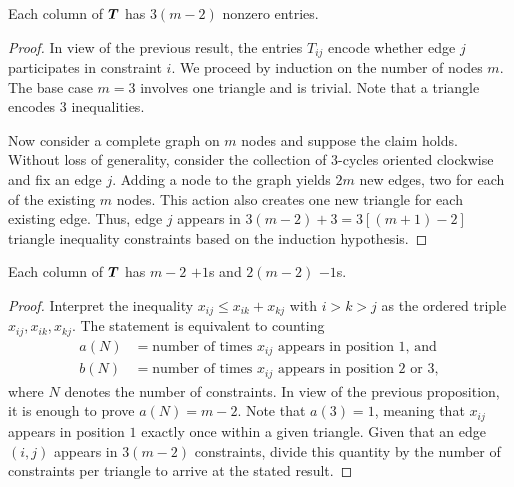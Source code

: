 \documentclass{article}
\begin{document}
\begin{proposition}
    Each column of \(\boldsymbol{T}\) has \(3 (m-2)\) nonzero entries.
\end{proposition}
\begin{proof}
    In view of the previous result, the entries \(T_{ij}\) encode whether edge \(j\) participates in constraint \(i\).
    We proceed by induction on the number of nodes \(m\).
    The base case \(m = 3\) involves one triangle and is trivial.
    Note that a triangle encodes \(3\) inequalities.

    Now consider a complete graph on \(m\) nodes and suppose the claim holds.
    Without loss of generality, consider the collection of \(3\)-cycles oriented clockwise and fix an edge \(j\).
    Adding a node to the graph yields \(2 m\) new edges, two for each of the existing \(m\) nodes.
    This action also creates one new triangle for each existing edge.
    Thus, edge \(j\) appears in \(3(m-2) + 3 = 3 [(m+1)-2]\) triangle inequality constraints based on the induction hypothesis.
\end{proof}

\begin{proposition}
    Each column of \(\boldsymbol{T}\) has \(m-2\) \(+1\)s and \(2(m-2)\) \(-1\)s.
\end{proposition}
\begin{proof}
Interpret the inequality \(x_{ij} \le x_{ik} + x_{kj}\) with \(i > k > j\) as the ordered triple \(x_{ij}, x_{ik}, x_{kj}\).
The statement is equivalent to counting
\begin{align*}
    a(N)
    &=
    \text{number of times \(x_{ij}\) appears in position 1, and}\\
    b(N)
    &=
    \text{number of times \(x_{ij}\) appears in position 2 or 3},
\end{align*}
where \(N\) denotes the number of constraints.
In view of the previous proposition, it is enough to prove \(a(N) = m-2\).
Note that \(a(3) = 1\), meaning that \(x_{ij}\) appears in position \(1\) exactly once within a given triangle.
Given that an edge \((i,j)\) appears in \(3 (m-2)\) constraints, divide this quantity by the number of constraints per triangle to arrive at the stated result.
\end{proof}
\end{document}
